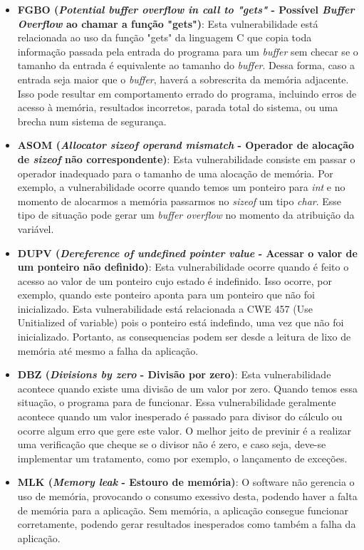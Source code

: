 \begin{itemize}
\item \textbf{FGBO (\emph{Potential buffer overflow in call to "gets" } - Possível \emph{Buffer Overflow} ao chamar a função "gets")}: Esta vulnerabilidade está relacionada ao uso da função "gets" da linguagem C que copia toda informação passada pela entrada do programa para um \emph{buffer} sem checar se o tamanho da entrada é equivalente ao tamanho do \emph{buffer}. Dessa forma, caso a entrada seja maior que o \emph{buffer}, haverá a sobrescrita da memória adjacente. Isso pode resultar em comportamento errado do programa, incluindo erros de acesso à memória, resultados incorretos, parada total do sistema, ou uma brecha num sistema de segurança.


\item \textbf{ASOM (\emph{Allocator sizeof operand mismatch } - Operador de alocação de \emph{sizeof} não correspondente)}:
%
Esta vulnerabilidade consiste em passar o operador inadequado para o tamanho de uma alocação de memória. Por exemplo, a vulnerabilidade ocorre quando temos um ponteiro para \emph{int} e no momento de alocarmos a memória passarmos no \emph{sizeof} um tipo \emph{char}. Esse tipo de situação pode gerar um \emph{buffer overflow} no momento da atribuição da variável.

\item \textbf{DUPV (\emph{Dereference of undefined pointer value } - Acessar o valor de um ponteiro não definido)}:
%
Esta vulnerabilidade ocorre quando é feito o acesso ao valor de um ponteiro cujo estado é indefinido. Isso ocorre, por exemplo, quando este ponteiro aponta para um ponteiro que não foi inicializado. Esta vulnerabilidade está relacionada a CWE 457 (Use Unitialized of variable) pois o ponteiro está indefindo, uma vez que não foi inicializado. Portanto, as consequencias podem ser desde a leitura de lixo de memória até mesmo a falha da aplicação.

\item \textbf{DBZ (\emph{Divisions by zero } - Divisão por zero)}:
%
Esta vulnerabilidade acontece quando existe uma divisão de um valor por zero. Quando temos essa situação, o programa para de funcionar. Essa vulnerabilidade geralmente acontece quando um valor inesperado é passado para divisor do cálculo ou ocorre algum erro que gere este valor. O melhor jeito de previnir é a realizar uma verificação que cheque se o divisor não é zero, e caso seja, deve-se implementar um tratamento, como por exemplo, o lançamento de exceções.

\item \textbf{MLK (\emph{Memory leak } - Estouro de memória)}:
%
O software não gerencia o uso de memória, provocando o consumo exessivo desta, podendo haver a falta de memória para a aplicação. Sem memória, a aplicação consegue funcionar corretamente, podendo gerar resultados inesperados como também a falha da aplicação.


\end{itemize}
